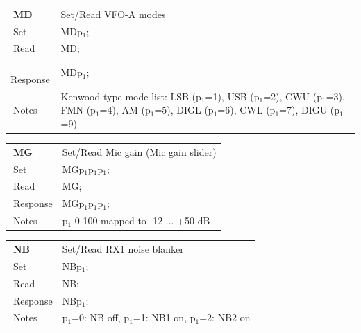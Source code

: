 \documentclass[12pt]{book}
\begin{document}
\begin{center}
\begin{tabular}{|p{2cm}|p{11cm}|}
\toprule
$\phantom{\Big|}$\textbf{\large MD} & Set/Read VFO-A modes \\\cline{1-2}
$\phantom{\Big|}${\large Set} & {MDp$_1$;} \\\hline
$\phantom{\Big|}${\large Read} & {MD;} \\\hline
$\phantom{\Big|}${\large Response} & {MDp$_1$;} \\\hline
$\phantom{\Big|}${\large Notes} & \multicolumn{1}{|p{11cm}|}{Kenwood-type  mode  list: LSB (p$_1$=1), USB (p$_1$=2), CWU (p$_1$=3), FMN (p$_1$=4), AM (p$_1$=5), DIGL (p$_1$=6), CWL (p$_1$=7), DIGU (p$_1$=9)} \\
\bottomrule
\end{tabular}
\end{center}

\begin{center}
\begin{tabular}{|p{2cm}|p{11cm}|}
\toprule
$\phantom{\Big|}$\textbf{\large MG} & Set/Read Mic gain (Mic gain slider) \\\cline{1-2}
$\phantom{\Big|}${\large Set} & {MGp$_1$p$_1$p$_1$;} \\\hline
$\phantom{\Big|}${\large Read} & {MG;} \\\hline
$\phantom{\Big|}${\large Response} & {MGp$_1$p$_1$p$_1$;} \\\hline
$\phantom{\Big|}${\large Notes} & \multicolumn{1}{|p{11cm}|}{p$_1$ 0-100 mapped to -12 ... +50 dB} \\
\bottomrule
\end{tabular}
\end{center}

\begin{center}
\begin{tabular}{|p{2cm}|p{11cm}|}
\toprule
$\phantom{\Big|}$\textbf{\large NB} & Set/Read RX1 noise blanker \\\cline{1-2}
$\phantom{\Big|}${\large Set} & {NBp$_1$;} \\\hline
$\phantom{\Big|}${\large Read} & {NB;} \\\hline
$\phantom{\Big|}${\large Response} & {NBp$_1$;} \\\hline
$\phantom{\Big|}${\large Notes} & \multicolumn{1}{|p{11cm}|}{p$_1$=0: NB off, p$_1$=1: NB1 on, p$_1$=2: NB2 on} \\
\bottomrule
\end{tabular}
\end{center}
\end{document}
